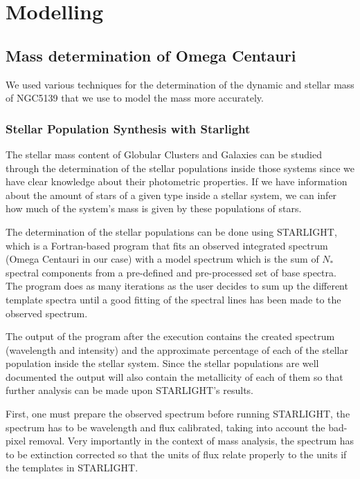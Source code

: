 \chapter{Modelling}

\section{Mass determination of Omega Centauri}

We used various techniques for the determination of the dynamic and stellar mass of NGC5139 that we use to model the mass more accurately. 

\subsection{Stellar Population Synthesis with Starlight}

The stellar mass content of Globular Clusters and Galaxies can be studied through the determination of the stellar populations inside those systems since we have clear knowledge about their photometric properties. If we have information about the amount of stars of a given type inside a stellar system, we can infer how much of the system's mass is given by these populations of stars. 

The determination of the stellar populations can be done using STARLIGHT, which is a Fortran-based program that fits an observed integrated spectrum (Omega Centauri in our case) with a model spectrum which is the sum of $N_{*}$ spectral components from a pre-defined and pre-processed set of base spectra. The program does as many iterations as the user decides to sum up the different template spectra until a good fitting of the spectral lines has been made to the observed spectrum. 

The output of the program after the execution contains the created spectrum (wavelength and intensity) and the approximate percentage of each of the stellar population inside the stellar system. Since the stellar populations are well documented the output will also contain the metallicity of each of them so that further analysis can be made upon STARLIGHT's results.

First, one must prepare the observed spectrum before running STARLIGHT, the spectrum has to be wavelength and flux calibrated, taking into account the bad-pixel removal. Very importantly in the context of mass analysis, the spectrum has to be extinction corrected so that the units of flux relate properly to the units if the templates in STARLIGHT.     

